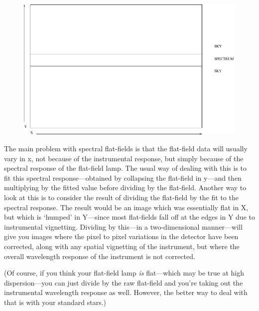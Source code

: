 \documentclass[11pt,twoside]{article}
\newcommand{\htmladdimg}[1]{}
\newenvironment{latexonly}{}{}
\newcommand{\latorhtm}[2]{#1}
\newcommand{\latorhtm}[2]{#2}
\begin{document}
\begin{latexonly}
\begin{figure}[htb]
\begin{center}
\includegraphics{sun86_2df}
\end{center}
\end{figure}
\end{latexonly}
\htmladdimg{2df.png}

   The main problem with spectral flat-fields is that the flat-field
   data will usually vary in x, not because of the instrumental
   response, but simply because of the spectral response of the
   flat-field lamp.  The usual way of dealing with this is to fit this
   spectral response\latorhtm{---}{-}obtained by collapsing the flat-field in
   y\latorhtm{---}{-}and then multiplying by the fitted value before dividing
   by the flat-field.  Another way to look at this is to consider the result of
   dividing the flat-field by the fit to the spectral response.  The
   result would be an image which was essentially flat in X, but which
   is `humped' in Y\latorhtm{---}{-}since most flat-fields fall off at the
   edges in Y due to instrumental vignetting.  Dividing by
   this\latorhtm{---}{-}in a two-dimensional manner\latorhtm{---}{-}will give
   you images where the pixel to
   pixel variations in the detector have been corrected, along with any
   spatial vignetting of the instrument, but where the overall
   wavelength response of the instrument is not corrected.

   (Of course, if you think your flat-field lamp {\em is\/}
   flat\latorhtm{---}{-}which may be true at high
   dispersion\latorhtm{---}{-}you can just divide by
   the raw flat-field and you're taking out the instrumental wavelength
   response as well.  However, the better way to deal with that is with
   your standard stars.)
\end{document}
